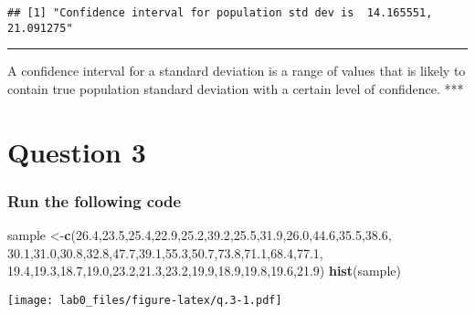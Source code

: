 \documentclass[
]{article}
\newenvironment{Shaded}{\begin{snugshade}}{\end{snugshade}}
\newcommand{\FloatTok}[1]{\textcolor[rgb]{0.00,0.00,0.81}{#1}}
\newcommand{\KeywordTok}[1]{\textcolor[rgb]{0.13,0.29,0.53}{\textbf{#1}}}
\newcommand{\NormalTok}[1]{#1}
\begin{document}
\begin{verbatim}
## [1] "Confidence interval for population std dev is  14.165551, 21.091275"
\end{verbatim}

\begin{center}\rule{0.5\linewidth}{0.5pt}\end{center}

A confidence interval for a standard deviation is a range of values that
is likely to contain true population standard deviation with a certain
level of confidence. ***

\hypertarget{question-3}{%
\section{Question 3}\label{question-3}}

\hypertarget{run-the-following-code}{%
\subsubsection{Run the following code}\label{run-the-following-code}}

\begin{Shaded}
\begin{Highlighting}[]
\NormalTok{sample <-}\KeywordTok{c}\NormalTok{(}\FloatTok{26.4}\NormalTok{,}\FloatTok{23.5}\NormalTok{,}\FloatTok{25.4}\NormalTok{,}\FloatTok{22.9}\NormalTok{,}\FloatTok{25.2}\NormalTok{,}\FloatTok{39.2}\NormalTok{,}\FloatTok{25.5}\NormalTok{,}\FloatTok{31.9}\NormalTok{,}\FloatTok{26.0}\NormalTok{,}\FloatTok{44.6}\NormalTok{,}\FloatTok{35.5}\NormalTok{,}\FloatTok{38.6}\NormalTok{,}
           \FloatTok{30.1}\NormalTok{,}\FloatTok{31.0}\NormalTok{,}\FloatTok{30.8}\NormalTok{,}\FloatTok{32.8}\NormalTok{,}\FloatTok{47.7}\NormalTok{,}\FloatTok{39.1}\NormalTok{,}\FloatTok{55.3}\NormalTok{,}\FloatTok{50.7}\NormalTok{,}\FloatTok{73.8}\NormalTok{,}\FloatTok{71.1}\NormalTok{,}\FloatTok{68.4}\NormalTok{,}\FloatTok{77.1}\NormalTok{,}
           \FloatTok{19.4}\NormalTok{,}\FloatTok{19.3}\NormalTok{,}\FloatTok{18.7}\NormalTok{,}\FloatTok{19.0}\NormalTok{,}\FloatTok{23.2}\NormalTok{,}\FloatTok{21.3}\NormalTok{,}\FloatTok{23.2}\NormalTok{,}\FloatTok{19.9}\NormalTok{,}\FloatTok{18.9}\NormalTok{,}\FloatTok{19.8}\NormalTok{,}\FloatTok{19.6}\NormalTok{,}\FloatTok{21.9}\NormalTok{)}
\KeywordTok{hist}\NormalTok{(sample)}
\end{Highlighting}
\end{Shaded}

\texttt{[image: lab0\_files/figure-latex/q.3-1.pdf]}
\end{document}
